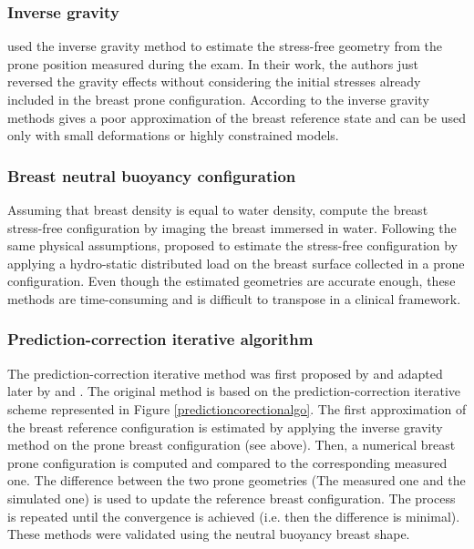  
 
  \subsubsection*{Inverse gravity}\label{subsubsection:inversegravity}
 \citep{palomar_finite_2008, sturgeon_finite_element_2016} used the inverse gravity method to estimate the stress-free geometry from the prone position measured during the exam. In their work, the authors just reversed the gravity effects without considering the initial stresses already included in the breast prone configuration. According to \cite{eiben_breast_2014} the inverse gravity methods gives a poor approximation of the breast reference state and can be used only with small deformations or highly constrained models.  

 \subsubsection*{Breast neutral buoyancy configuration}
 Assuming that breast density is equal to water density, \cite{rajagopal_creating_2008} compute the breast stress-free configuration by imaging the breast immersed in water. Following the same physical assumptions, \cite{kuhlmann_mechanical_2013} proposed to estimate the stress-free configuration by applying a hydro-static distributed load on the breast surface collected in a prone configuration. Even though the estimated geometries are accurate enough, these methods are time-consuming and is difficult to transpose in a clinical framework. 

 \subsubsection*{Prediction-correction iterative algorithm}
 The prediction-correction iterative method was first proposed by \citep{govindjee_computational_1998} and adapted later by \cite{carter_biomechanical_2009} and \cite{eiben_breast_2014}. The original method is based on the prediction-correction iterative scheme represented in Figure \ref{predictioncorectionalgo}. The first approximation of the breast reference configuration is estimated by applying the inverse gravity method on the prone breast configuration (see above).  Then, a numerical breast prone configuration is computed and compared to the corresponding measured one. The difference between the two prone geometries (The measured one and the simulated one) is used to update the reference breast configuration. The process is repeated until the convergence is achieved (i.e. then the difference is minimal). These methods were validated using the neutral buoyancy breast shape.


